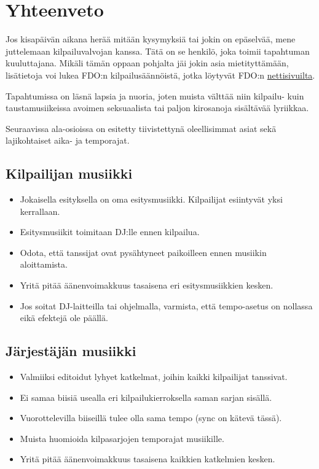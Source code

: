 \documentclass[12pt, a4paper, oneside]{article}
\begin{document}
\section{Yhteenveto} \label{yhteenveto}

Jos kisapäivän aikana herää mitään kysymyksiä tai jokin on epäselvää,
mene juttelemaan kilpailuvalvojan kanssa.
Tätä on se henkilö,
joka toimii tapahtuman kuuluttajana.
Mikäli tämän oppaan pohjalta jäi jokin asia mietityttämään,
lisätietoja voi lukea FDO:n kilpailusäännöistä,
jotka löytyvät FDO:n \href{https://fdo.fi/kilpailut/}{nettisivuilta}.

Tapahtumissa on läsnä lapsia ja nuoria,
joten muista välttää niin kilpailu- kuin taustamusiikeissa avoimen seksuaalista tai paljon kirosanoja sisältävää lyriikkaa.

Seuraavissa ala-osioissa on esitetty tiivistettynä oleellisimmat asiat sekä lajikohtaiset aika- ja temporajat.

\subsection{Kilpailijan musiikki}

\begin{itemize}[itemsep=-2pt]
    \item Jokaisella esityksella on oma esitysmusiikki. Kilpailijat esiintyvät yksi kerrallaan.
    \item Esitysmusiikit toimitaan DJ:lle ennen kilpailua.
    \item Odota, että tanssijat ovat pysähtyneet paikoilleen ennen musiikin aloittamista.
    \item Yritä pitää äänenvoimakkuus tasaisena eri esitysmusiikkien kesken.
    \item Jos soitat DJ-laitteilla tai ohjelmalla, varmista, että tempo-asetus on nollassa eikä efektejä ole päällä.
\end{itemize}

\subsection{Järjestäjän musiikki}

\begin{itemize}[itemsep=-2pt]
    \item Valmiiksi editoidut lyhyet katkelmat, joihin kaikki kilpailijat tanssivat.
    \item Ei samaa biisiä usealla eri kilpailukierroksella saman sarjan sisällä.
    \item Vuorottelevilla biiseillä tulee olla sama tempo (sync on kätevä tässä).
    \item Muista huomioida kilpasarjojen temporajat musiikille.
    \item Yritä pitää äänenvoimakkuus tasaisena kaikkien katkelmien kesken.
\end{itemize}
\end{document}
